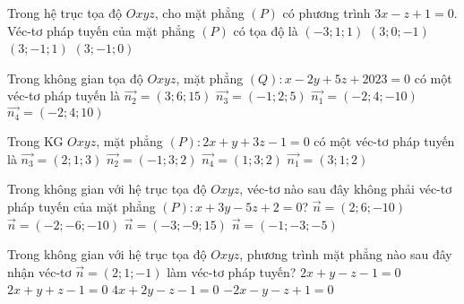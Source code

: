 \begin{ex}%
		Trong hệ trục tọa độ $Oxyz$, cho mặt phẳng $(P)$ có phương trình $3x-z+1=0$. Véc-tơ pháp tuyến của mặt phẳng $(P)$ có tọa độ là
	\choice
	{$(-3;1;1)$}
	{\True $(3;0;-1)$}
	{$(3;-1;1)$}
	{$(3;-1;0)$}
\end{ex}


\begin{ex}%
	Trong không gian tọa độ $Oxyz$, mặt phẳng $(Q) \colon x-2y+5z+2023=0$ có một véc-tơ pháp tuyến là
	\choice
	{$\overrightarrow{n_2}=(3;6;15)$}
	{$\overrightarrow{n_3}=(-1;2;5)$}
	{\True $\overrightarrow{n_1}=(-2;4;-10)$}
	{$\overrightarrow{n_4}=(-2;4;10)$}
\end{ex}

\begin{ex}%
Trong KG $Oxyz$, mặt phẳng $(P) \colon 2x+y+3z-1=0$ có một véc-tơ pháp tuyến là
	\choice
	{$\overrightarrow{n_3}=(2;1;3)$}
	{$\overrightarrow{n_2}=(-1;3;2)$}
	{$\overrightarrow{n_4}=(1;3;2)$}
	{$\overrightarrow{n_1}=(3;1;2)$}
\end{ex}

\begin{ex}%
	Trong không gian với hệ trục tọa độ $Oxyz$, véc-tơ nào sau đây không phải véc-tơ pháp tuyến của mặt phẳng $(P) \colon x+3y-5z+2=0$?
	\choice
	{$\overrightarrow{n}=(2;6;-10)$}
	{\True $\overrightarrow{n}=(-2;-6;-10)$}
	{$\overrightarrow{n}=(-3;-9;15)$}
	{$\overrightarrow{n}=(-1;-3;-5)$}
\end{ex}
 \begin{ex}%
 		Trong không gian với hệ trục tọa độ $Oxyz$, phương trình mặt phẳng nào sau đây nhận véc-tơ $\overrightarrow{n}=(2;1;-1)$ làm véc-tơ pháp tuyến?
 	\choice
 	{\True $2x+y-z-1=0$}
 	{$2x+y+z-1=0$}
 	{$4x+2y-z-1=0$}
 	{$-2x-y-z+1=0$}
 \end{ex}

